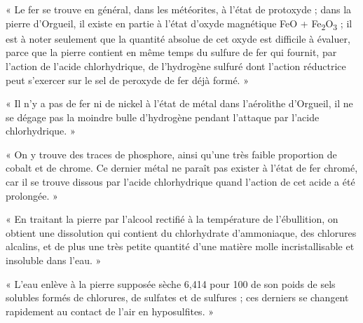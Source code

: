 \documentclass[a4paper, 11pt, oneside, polutonikogreek, french]{article}
\begin{document}
« Le fer se trouve en général, dans les météorites, à l'état de protoxyde ; dans la pierre d'Orgueil, il existe en partie à l'état d'oxyde magnétique FeO + Fe\textsubscript{2}O\textsubscript{3} ; il est à noter seulement que la quantité absolue de cet oxyde est difficile à évaluer, parce que la pierre contient en même temps du sulfure de fer qui fournit, par l'action de l'acide chlorhydrique, de l'hydrogène sulfuré dont l'action réductrice peut s'exercer sur le sel de peroxyde de fer déjà formé. »

« Il n'y a pas de fer ni de nickel à l'état de métal dans l'aérolithe d'Orgueil, il ne se dégage pas la moindre bulle d'hydrogène pendant l'attaque par l'acide chlorhydrique. »

« On y trouve des traces de phosphore, ainsi qu'une très faible proportion de cobalt et de chrome. Ce dernier métal ne paraît pas exister à l'état de fer chromé, car il se trouve dissous par l'acide chlorhydrique quand l'action de cet acide a été prolongée. »

« En traitant la pierre par l'alcool rectifié à la température de l'ébullition, on obtient une dissolution qui contient du chlorhydrate d'ammoniaque, des chlorures alcalins, et de plus une très petite quantité d'une matière molle incristallisable et insoluble dans l'eau. »

« L'eau enlève à la pierre supposée sèche 6,414 pour 100 de son poids de sels solubles formés de chlorures, de sulfates et de sulfures ; ces derniers se changent rapidement au contact de l'air en hyposulfites. »
\end{document}
